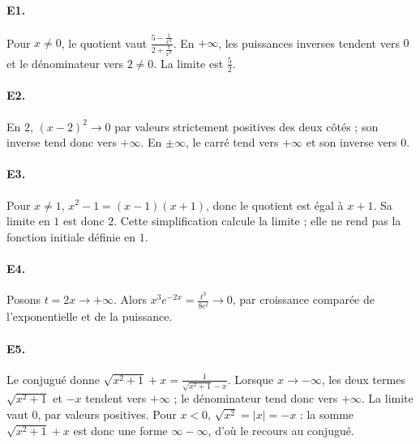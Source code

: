 \paragraph{E1.}Pour $x\ne0$, le quotient vaut $\frac{5-\frac{1}{x^2}}{2+\frac{7}{x^3}}$. En $+\infty$, les puissances inverses tendent vers $0$ et le dénominateur vers $2\ne0$. La limite est $\frac{5}{2}$.

\paragraph{E2.}En $2$, $(x-2)^2\to0$ par valeurs strictement positives des deux côtés ; son inverse tend donc vers $+\infty$. En $\pm\infty$, le carré tend vers $+\infty$ et son inverse vers $0$.

\paragraph{E3.}Pour $x\ne1$, $x^2-1=(x-1)(x+1)$, donc le quotient est égal à $x+1$. Sa limite en $1$ est donc $2$. Cette simplification calcule la limite ; elle ne rend pas la fonction initiale définie en $1$.

\paragraph{E4.}Posons $t=2x\to+\infty$. Alors $x^3e^{-2x}=\frac{t^3}{8e^t}\to0$, par croissance comparée de l'exponentielle et de la puissance.

\paragraph{E5.}Le conjugué donne $\sqrt{x^2+1}+x=\frac{1}{\sqrt{x^2+1}-x}$. Lorsque $x\to-\infty$, les deux termes $\sqrt{x^2+1}$ et $-x$ tendent vers $+\infty$ ; le dénominateur tend donc vers $+\infty$. La limite vaut $0$, par valeurs positives. Pour $x<0$, $\sqrt{x^2}=|x|=-x$ : la somme $\sqrt{x^2+1}+x$ est donc une forme $\infty-\infty$, d'où le recours au conjugué.


